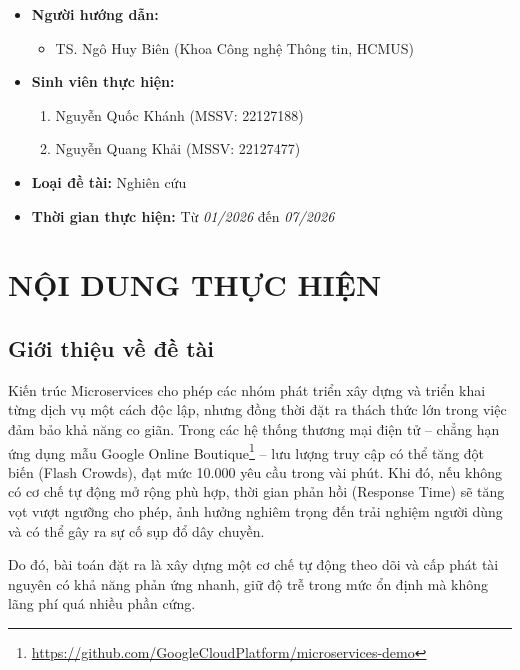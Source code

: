 \documentclass[14pt]{article}
\begin{document}
\begin{itemize}[leftmargin=1.5cm, label=\textbullet]
    \item \textbf{Người hướng dẫn:}
    \begin{itemize}[label=--]
        \item TS. Ngô Huy Biên (Khoa Công nghệ Thông tin, HCMUS)
    \end{itemize}

    \item \textbf{Sinh viên thực hiện:}
    \begin{enumerate}[label=\arabic*.]
        \item Nguyễn Quốc Khánh (MSSV: 22127188)
        \item Nguyễn Quang Khải (MSSV: 22127477)
    \end{enumerate}

    \item \textbf{Loại đề tài:} Nghiên cứu

    \item \textbf{Thời gian thực hiện:} Từ \textit{01/2026} đến \textit{07/2026}
\end{itemize}

\section{NỘI DUNG THỰC HIỆN}

\subsection{Giới thiệu về đề tài}

Kiến trúc Microservices cho phép các nhóm phát triển xây dựng và triển khai từng dịch vụ một cách độc lập, nhưng đồng thời đặt ra thách thức lớn trong việc đảm bảo khả năng co giãn. Trong các hệ thống thương mại điện tử -- chẳng hạn ứng dụng mẫu Google Online Boutique\footnote{\url{https://github.com/GoogleCloudPlatform/microservices-demo}} \cite{google2020boutique} -- lưu lượng truy cập có thể tăng đột biến (Flash Crowds), đạt mức 10.000 yêu cầu trong vài phút. Khi đó, nếu không có cơ chế tự động mở rộng phù hợp, thời gian phản hồi (Response Time) sẽ tăng vọt vượt ngưỡng cho phép, ảnh hưởng nghiêm trọng đến trải nghiệm người dùng và có thể gây ra sự cố sụp đổ dây chuyền.

Do đó, bài toán đặt ra là xây dựng một cơ chế tự động theo dõi và cấp phát tài nguyên có khả năng phản ứng nhanh, giữ độ trễ trong mức ổn định mà không lãng phí quá nhiều phần cứng.
\end{document}
